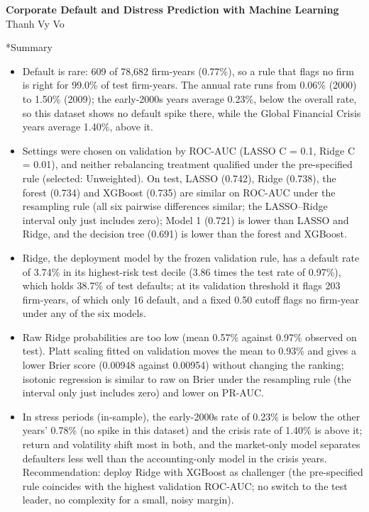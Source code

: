\documentclass[9pt,letterpaper]{extarticle}
\makeatletter
\renewcommand\section{\@startsection{section}{1}{\z@}{6pt plus 2pt minus 1pt}{3pt plus 1pt}%
  {\normalfont\large\bfseries\color{navy}}}
\makeatother
\begin{document}
\begin{center}
  {\Large\bfseries\color{navy} Corporate Default and Distress Prediction with Machine Learning}\\[2pt]
  {\normalsize Thanh Vy Vo}
\end{center}
\vspace{-4pt}

\section*{Summary}
\begin{itemize}
  \item Default is rare: 609 of 78,682 firm-years (0.77\%), so a rule that flags no firm is right for 99.0\% of test firm-years. The annual rate runs from 0.06\% (2000) to 1.50\% (2009); the early-2000s years average 0.23\%, below the overall rate, so this dataset shows no default spike there, while the Global Financial Crisis years average 1.40\%, above it.
  \item Settings were chosen on validation by ROC-AUC (LASSO C = 0.1, Ridge C = 0.01), and neither rebalancing treatment qualified under the pre-specified rule (selected: Unweighted). On test, LASSO (0.742), Ridge (0.738), the forest (0.734) and XGBoost (0.735) are similar on ROC-AUC under the resampling rule (all six pairwise differences similar; the LASSO--Ridge interval only just includes zero); Model 1 (0.721) is lower than LASSO and Ridge, and the decision tree (0.691) is lower than the forest and XGBoost.
  \item Ridge, the deployment model by the frozen validation rule, has a default rate of 3.74\% in its highest-risk test decile (3.86 times the test rate of 0.97\%), which holds 38.7\% of test defaults; at its validation threshold it flags 203 firm-years, of which only 16 default, and a fixed 0.50 cutoff flags no firm-year under any of the six models.
  \item Raw Ridge probabilities are too low (mean 0.57\% against 0.97\% observed on test). Platt scaling fitted on validation moves the mean to 0.93\% and gives a lower Brier score (0.00948 against 0.00954) without changing the ranking; isotonic regression is similar to raw on Brier under the resampling rule (the interval only just includes zero) and lower on PR-AUC.
  \item In stress periods (in-sample), the early-2000s rate of 0.23\% is below the other years' 0.78\% (no spike in this dataset) and the crisis rate of 1.40\% is above it; return and volatility shift most in both, and the market-only model separates defaulters less well than the accounting-only model in the crisis years. Recommendation: deploy Ridge with XGBoost as challenger (the pre-specified rule coincides with the highest validation ROC-AUC; no switch to the test leader, no complexity for a small, noisy margin).
\end{itemize}
\end{document}
